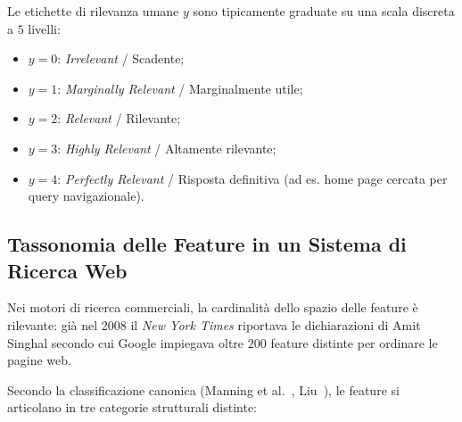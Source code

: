 Le etichette di rilevanza umane $y$ sono tipicamente graduate su una scala discreta a $5$ livelli:
\begin{itemize}
    \item $y = 0$: \textit{Irrelevant} / Scadente;
    \item $y = 1$: \textit{Marginally Relevant} / Marginalmente utile;
    \item $y = 2$: \textit{Relevant} / Rilevante;
    \item $y = 3$: \textit{Highly Relevant} / Altamente rilevante;
    \item $y = 4$: \textit{Perfectly Relevant} / Risposta definitiva (ad es. home page cercata per query navigazionale).
\end{itemize}

\FloatBarrier
\subsection{Tassonomia delle Feature in un Sistema di Ricerca Web}
\label{subsec:tassonomia-feature-ltr}

Nei motori di ricerca commerciali, la cardinalit\`a dello spazio delle feature \`e rilevante: gi\`a nel 2008 il \emph{New York Times} riportava le dichiarazioni di Amit Singhal secondo cui Google impiegava oltre $200$ feature distinte per ordinare le pagine web.

Secondo la classificazione canonica (Manning et al.~\cite{manning2008}, Liu~\cite{liu2009}), le feature si articolano in tre categorie strutturali distinte:

